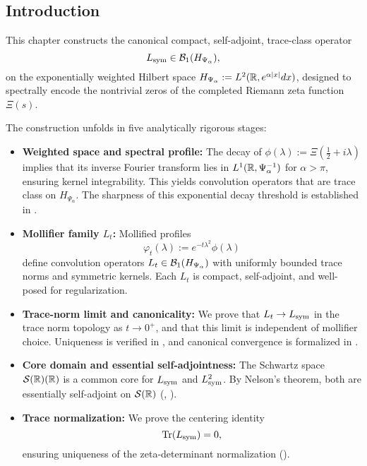 \subsection*{Introduction}

This chapter constructs the canonical compact, self-adjoint, trace-class operator
\[
L_{\mathrm{sym}} \in \mathcal{B}_1(H_{\Psi_\alpha}),
\]
on the exponentially weighted Hilbert space \( H_{\Psi_\alpha} := L^2(\mathbb{R}, e^{\alpha |x|} dx) \), designed to spectrally encode the nontrivial zeros of the completed Riemann zeta function \( \Xi(s) \).

The construction unfolds in five analytically rigorous stages:

\begin{itemize}
    \item \textbf{Weighted space and spectral profile:} The decay of \( \phi(\lambda) := \Xi(\tfrac{1}{2} + i\lambda) \) implies that its inverse Fourier transform lies in \( L^1(\mathbb{R}, \Psi_\alpha^{-1}) \) for \( \alpha > \pi \), ensuring kernel integrability. This yields convolution operators that are trace class on \( H_{\Psi_\alpha} \). The sharpness of this exponential decay threshold is established in .

    \item \textbf{Mollifier family \( L_t \):} Mollified profiles
    \[
    \varphi_t(\lambda) := e^{-t\lambda^2} \phi(\lambda)
    \]
    define convolution operators \( L_t \in \mathcal{B}_1(H_{\Psi_\alpha}) \) with uniformly bounded trace norms and symmetric kernels. Each \( L_t \) is compact, self-adjoint, and well-posed for regularization.

    \item \textbf{Trace-norm limit and canonicality:} We prove that \( L_t \to L_{\mathrm{sym}} \) in the trace norm topology as \( t \to 0^+ \), and that this limit is independent of mollifier choice. Uniqueness is verified in , and canonical convergence is formalized in .

    \item \textbf{Core domain and essential self-adjointness:} The Schwartz space \( \mathcal{S}(\mathbb{R})(\mathbb{R}) \) is a common core for \( L_{\mathrm{sym}} \) and \( L_{\mathrm{sym}}^2 \). By Nelson’s theorem, both are essentially self-adjoint on \( \mathcal{S}(\mathbb{R}) \) (, ).

    \item \textbf{Trace normalization:} We prove the centering identity
    \[
    \operatorname{Tr}(L_{\mathrm{sym}}) = 0,
    \]
    ensuring uniqueness of the zeta-determinant normalization ().
\end{itemize}

